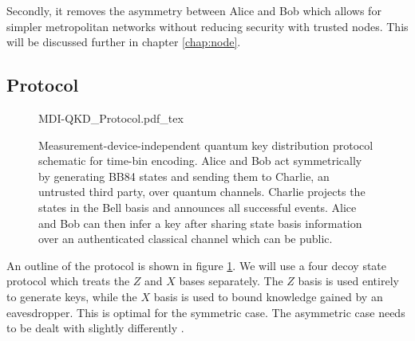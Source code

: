 Secondly, it removes the asymmetry between Alice and Bob which allows for simpler metropolitan networks without reducing security with trusted nodes. This will be discussed further in chapter \ref{chap:node}.

\subsection{Protocol}

\begin{figure}[tp]
	\centering
	\small
	\def\svgwidth{\textwidth} 
	{MDI-QKD_Protocol.pdf_tex}
	\caption[Measure-device-independent quantum key distribution time-bin encoded protocol]{Measurement-device-independent quantum key distribution protocol schematic for time-bin encoding. Alice and Bob act symmetrically by generating BB84 states and sending them to Charlie, an untrusted third party, over quantum channels. Charlie projects the states in the Bell basis and announces all successful events. Alice and Bob can then infer a key after sharing state basis information over an authenticated classical channel which can be public.}
	\label{fig:mdi_protocol}
\end{figure}

An outline of the protocol is shown in figure \ref{fig:mdi_protocol}. We will use a four decoy state protocol \cite{zhou2016} which treats the $Z$ and $X$ bases separately. The $Z$ basis is used entirely to generate keys, while the $X$ basis is used to bound knowledge gained by an eavesdropper. This is optimal for the symmetric case. The asymmetric case needs to be dealt with slightly differently \cite{wang2018}.

